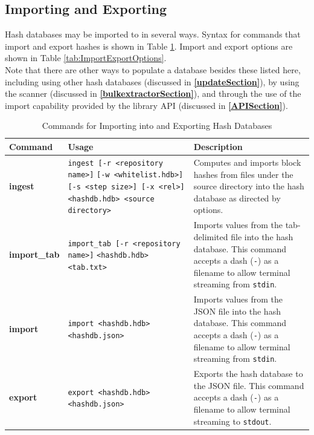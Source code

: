 \documentclass[11pt,fleqn]{article} %
\begin{document}
\subsection{Importing and Exporting}
Hash databases may be imported to in several ways.  Syntax for commands that import and export hashes is shown in Table \ref{tab:importExport}. Import and export options are shown in Table \ref{tab:ImportExportOptions}.\\

Note that there are other ways to populate a database besides these listed here, including using other hash databases (discussed in \textbf{\autoref{updateSection}}),
by using the \bulk \hdb scanner (discussed in \textbf{\autoref{bulkextractorSection}}),
and through the use of the import capability provided by the \hdb library API (discussed in \textbf{\autoref{APISection}}).\\

\begin{table}[!ht]
\centering
\caption{Commands for Importing into and Exporting Hash Databases}
\label{tab:importExport}
\begin{tabular}{|p{2.5 cm}|p{7 cm}|p{4 cm}|}
\hline \hline
\textbf{Command} & \textbf{Usage} & \textbf{Description} \\
\hline
\textbf{ingest} & \verb+ingest [-r <repository name>]+ \verb+[-w <whitelist.hdb>]+ \verb+[-s <step size>] [-x <rel>]+ \verb+ <hashdb.hdb> <source directory>+& Computes and imports block hashes from files under the source directory into the hash database as directed by options.\\
\hline
\textbf{import\_tab} & \verb+import_tab [-r <repository name>]+ \verb+<hashdb.hdb>+ \verb+<tab.txt>+& Imports values from the tab-delimited file into the hash database. This command accepts a dash (\verb+-+) as a filename to allow terminal streaming from \verb+stdin+.\\
\hline
\textbf{import} & \verb+import <hashdb.hdb>+ \verb+<hashdb.json>+& Imports values from the JSON file into the hash database. This command accepts a dash (\verb+-+) as a filename to allow terminal streaming from \verb+stdin+.\\
\hline
\textbf{export} & \verb+export <hashdb.hdb>+ \verb+<hashdb.json>+& Exports the hash database to the JSON file. This command accepts a dash (\verb+-+) as a filename to allow terminal streaming to \verb+stdout+.\\
\hline
\end{tabular}
\end{table}
\end{document}
